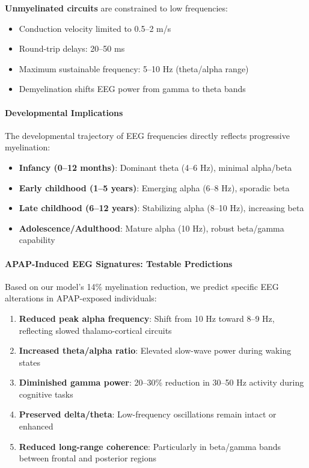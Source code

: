 \documentclass[11pt]{article}
\begin{document}
\textbf{Unmyelinated circuits} are constrained to low frequencies:
\begin{itemize}
\item Conduction velocity limited to 0.5--2 m/s
\item Round-trip delays: 20--50 ms
\item Maximum sustainable frequency: 5--10 Hz (theta/alpha range)
\item Demyelination shifts EEG power from gamma to theta bands \citep{dubey2022}
\end{itemize}

\paragraph{Developmental Implications}
The developmental trajectory of EEG frequencies directly reflects progressive myelination:
\begin{itemize}
\item \textbf{Infancy (0--12 months)}: Dominant theta (4--6 Hz), minimal alpha/beta
\item \textbf{Early childhood (1--5 years)}: Emerging alpha (6--8 Hz), sporadic beta
\item \textbf{Late childhood (6--12 years)}: Stabilizing alpha (8--10 Hz), increasing beta
\item \textbf{Adolescence/Adulthood}: Mature alpha (10 Hz), robust beta/gamma capability
\end{itemize}

\paragraph{APAP-Induced EEG Signatures: Testable Predictions}
Based on our model's 14\% myelination reduction, we predict specific EEG alterations in APAP-exposed individuals:

\begin{enumerate}
\item \textbf{Reduced peak alpha frequency}: Shift from 10 Hz toward 8--9 Hz, reflecting slowed thalamo-cortical circuits
\item \textbf{Increased theta/alpha ratio}: Elevated slow-wave power during waking states
\item \textbf{Diminished gamma power}: 20--30\% reduction in 30--50 Hz activity during cognitive tasks
\item \textbf{Preserved delta/theta}: Low-frequency oscillations remain intact or enhanced
\item \textbf{Reduced long-range coherence}: Particularly in beta/gamma bands between frontal and posterior regions
\end{enumerate}
\end{document}
